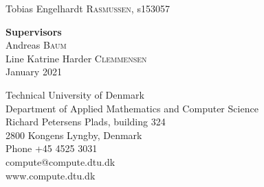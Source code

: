 \begin{titlepage}
\begin{center}
\large Tobias Engelhardt \textsc{Rasmussen}, s153057 %
\end{center}
\begin{center}
\large \textbf{Supervisors} \\
\large Andreas \textsc{Baum} \\
\large Line Katrine Harder \textsc{Clemmensen}\\[5cm]
{\large January 2021}\\[3cm]
\end{center}





 


\end{titlepage}

\thispagestyle{empty}
\vspace*{\fill}

\noindent Technical University of Denmark \\
Department of Applied Mathematics and Computer Science \\
Richard Petersens Plads, building 324 \\
2800 Kongens Lyngby, Denmark \\
Phone +45 4525 3031 \\
compute@compute.dtu.dk \\ 
www.compute.dtu.dk \\